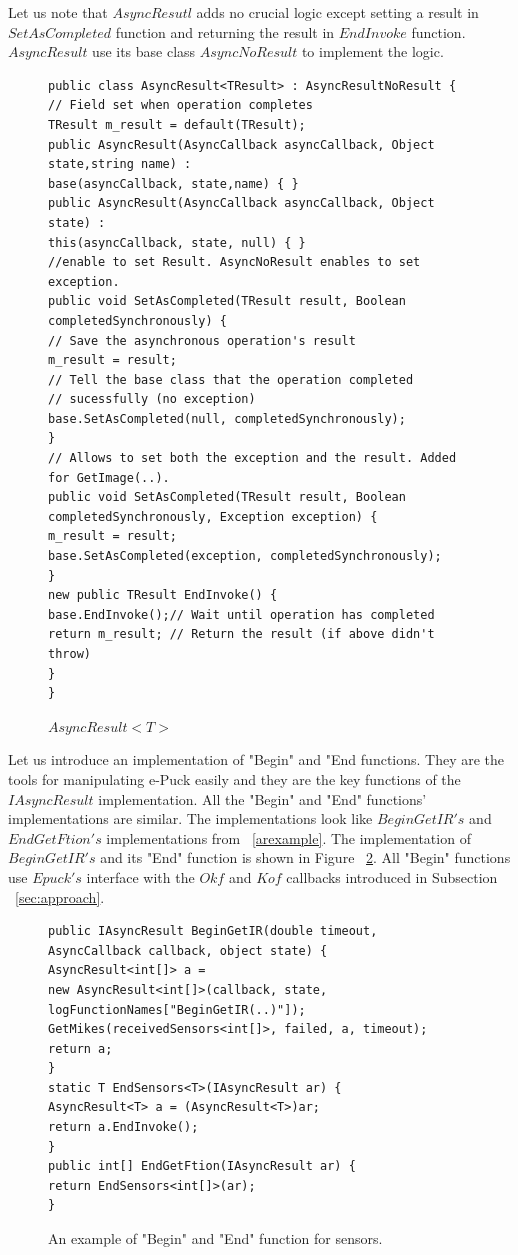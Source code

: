   Let us note that $AsyncResutl$ adds no crucial logic except setting a result in $SetAsCompleted$ function and
  returning the result in $EndInvoke$ function. 
  $AsyncResult$ use its base class $AsyncNoResult$ to implement the logic.
\begin{figure}[!hbp]
\begin{lstlisting}
public class AsyncResult<TResult> : AsyncResultNoResult {
// Field set when operation completes
TResult m_result = default(TResult);
public AsyncResult(AsyncCallback asyncCallback, Object state,string name) : 
base(asyncCallback, state,name) { }
public AsyncResult(AsyncCallback asyncCallback, Object state) : 
this(asyncCallback, state, null) { }
//enable to set Result. AsyncNoResult enables to set exception.
public void SetAsCompleted(TResult result, Boolean completedSynchronously) {
// Save the asynchronous operation's result
m_result = result;
// Tell the base class that the operation completed 
// sucessfully (no exception)
base.SetAsCompleted(null, completedSynchronously);
}
// Allows to set both the exception and the result. Added for GetImage(..).
public void SetAsCompleted(TResult result, Boolean completedSynchronously, Exception exception) {
m_result = result;
base.SetAsCompleted(exception, completedSynchronously);
}
new public TResult EndInvoke() {
base.EndInvoke();// Wait until operation has completed 
return m_result; // Return the result (if above didn't throw)
}
}
\end{lstlisting}
\caption{$AsyncResult<T>$} \label{result}
\end{figure}

  Let us introduce an implementation of "Begin" and "End functions.
  They are the tools for manipulating e-Puck easily and they are the key functions of the $IAsyncResult$ implementation.
  All the "Begin" and "End" functions' implementations are similar. The implementations look like $BeginGetIR's$
  and $EndGetFtion's$ implementations from ~\ref{arexample}.
  The implementation of $BeginGetIR's$ and its "End" function is shown in Figure ~\ref{beginsens}.
  All "Begin" functions use $Epuck's$ interface with the $Okf$ and $Kof$ callbacks introduced
  in Subsection ~\ref{sec:approach}.	

\begin{figure}[!hbp]
\begin{lstlisting}
public IAsyncResult BeginGetIR(double timeout, AsyncCallback callback, object state) {
AsyncResult<int[]> a = 
new AsyncResult<int[]>(callback, state, logFunctionNames["BeginGetIR(..)"]);
GetMikes(receivedSensors<int[]>, failed, a, timeout);
return a;
}
static T EndSensors<T>(IAsyncResult ar) {
AsyncResult<T> a = (AsyncResult<T>)ar;
return a.EndInvoke();
}
public int[] EndGetFtion(IAsyncResult ar) { 
return EndSensors<int[]>(ar); 
}
\end{lstlisting}	
\caption{An example of "Begin" and "End" function for sensors.}
\label{beginsens}
\end{figure}

